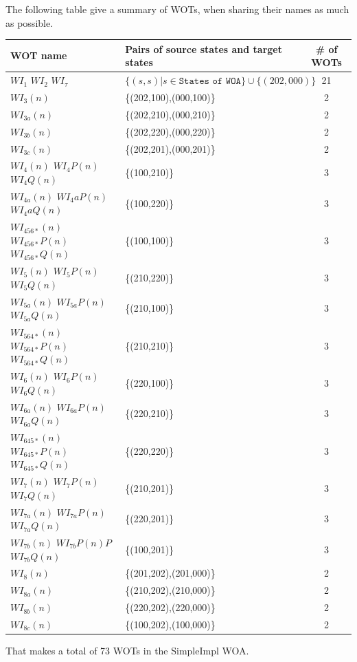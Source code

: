 \bigskip
The following table give a summary of  WOTs, when sharing their names as much as possible.

\begin{tabular}{|l|l|c|}
\hline
    WOT name & Pairs of source states and target states & \# of WOTs \\
    \hline
    $WI_1$ $WI_2$ $WI_\tau$ & $\{(s,s)| s \in \texttt{States of WOA}\} \cup \{(202,000)\} $ & 21 \\
    $WI_3(n)$ & \{(202,100),(000,100)\} & 2 \\
    $WI_{3a}(n)$ & \{(202,210),(000,210)\} & 2 \\
    $WI_{3b}(n)$ & \{(202,220),(000,220)\} & 2 \\
    $WI_{3c}(n)$ & \{(202,201),(000,201)\} & 2 \\
    $WI_4(n)$ $WI_4P(n)$ $WI_4Q(n)$ & \{(100,210)\} & 3 \\
    $WI_{4a}(n)$ $WI_4aP(n)$ $WI_4aQ(n)$ & \{(100,220)\} & 3 \\
    $WI_{456*}(n) $ $WI_{456*}P(n) $ $WI_{456*}Q(n) $ & \{(100,100)\} & 3 \\
    $WI_5(n)$ $WI_5P(n)$ $WI_5Q(n)$ & \{(210,220)\} & 3 \\
    $WI_{5a}(n)$ $WI_{5a}P(n)$ $WI_{5a}Q(n)$ & \{(210,100)\} & 3 \\
    $WI_{564*}(n) $ $WI_{564*}P(n) $ $WI_{564*}Q(n) $ & \{(210,210)\} & 3 \\
    $WI_6(n)$ $WI_6P(n)$ $WI_6Q(n)$ & \{(220,100)\} & 3 \\
    $WI_{6a}(n)$ $WI_{6a}P(n)$ $WI_{6a}Q(n)$ & \{(220,210)\} & 3 \\
    $WI_{645*}(n) $ $WI_{645*}P(n) $ $WI_{645*}Q(n) $ & \{(220,220)\} & 3 \\
    $WI_7(n)$ $WI_7P(n)$ $WI_7Q(n)$ & \{(210,201)\} & 3 \\
    $WI_{7a}(n)$ $WI_{7a}P(n)$ $WI_{7a}Q(n)$ & \{(220,201)\} & 3 \\
    $WI_{7b}(n)$ $WI_{7b}P(n)P$ $WI_{7b}Q(n)$ & \{(100,201)\} & 3 \\
    $WI_8(n)$ & \{(201,202),(201,000)\} & 2\\ 
    $WI_{8a}(n)$ & \{(210,202),(210,000)\} & 2 \\
    $WI_{8b}(n)$ & \{(220,202),(220,000)\} & 2 \\
    $WI_{8c}(n)$ & \{(100,202),(100,000)\} & 2 \\
   
    \hline
    \end{tabular}
    \bigskip
    That makes a total of 73 WOTs  in the SimpleImpl WOA.



